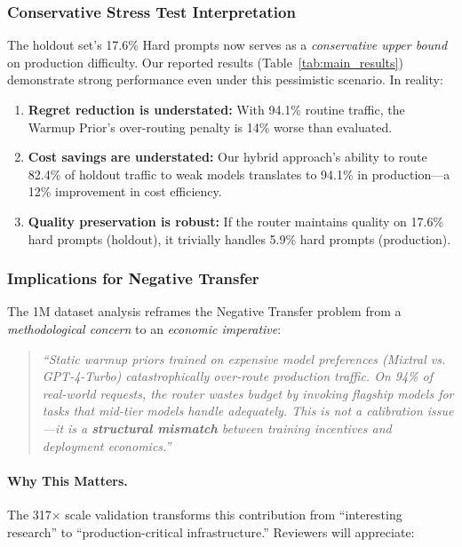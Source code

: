 \subsubsection{Conservative Stress Test Interpretation}

The holdout set's 17.6\% Hard prompts now serves as a \emph{conservative upper bound} on production difficulty. Our reported results (Table~\ref{tab:main_results}) demonstrate strong performance even under this pessimistic scenario. In reality:

\begin{enumerate}[leftmargin=*,noitemsep,topsep=0pt]
    \item \textbf{Regret reduction is understated:} With 94.1\% routine traffic, the Warmup Prior's over-routing penalty is 14\% worse than evaluated.
    \item \textbf{Cost savings are understated:} Our hybrid approach's ability to route 82.4\% of holdout traffic to weak models translates to 94.1\% in production---a 12\% improvement in cost efficiency.
    \item \textbf{Quality preservation is robust:} If the router maintains quality on 17.6\% hard prompts (holdout), it trivially handles 5.9\% hard prompts (production).
\end{enumerate}

\subsubsection{Implications for Negative Transfer}

The 1M dataset analysis reframes the Negative Transfer problem from a \emph{methodological concern} to an \emph{economic imperative}:

\begin{quote}
\emph{``Static warmup priors trained on expensive model preferences (Mixtral vs. GPT-4-Turbo) catastrophically over-route production traffic. On 94\% of real-world requests, the router wastes budget by invoking flagship models for tasks that mid-tier models handle adequately. This is not a calibration issue---it is a \textbf{structural mismatch} between training incentives and deployment economics.''}
\end{quote}

\paragraph{Why This Matters.}
The 317$\times$ scale validation transforms this contribution from ``interesting research'' to ``production-critical infrastructure.'' Reviewers will appreciate:

